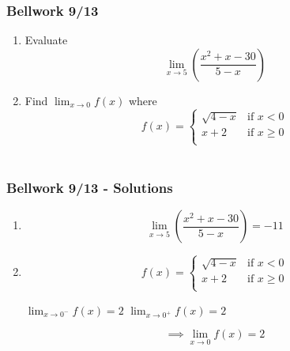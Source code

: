 \documentclass[12pt]{beamer}
\begin{document}
\begin{frame}
	\frametitle{Bellwork 9/13}
	\large
	\vspace*{\fill}
	\vspace*{\fill}
	\initclock
	\begin{enumerate}
		\item Evaluate \[\displaystyle\lim_{x\to5}\left(\frac{x^2+x-30}{5-x}\right)\]
		      \vspace*{\fill}
		\item Find $\displaystyle\lim_{x\to0}f(x)$ where
		      \[
			      f(x) =
			      \begin{cases}
				      \sqrt{4-x} & \text{if } x < 0    \\
				      x+2        & \text{if } x \geq 0 \\
			      \end{cases}
		      \]\\
	\end{enumerate}
	\vspace*{\fill}
	\vspace*{\fill}
	\crono
\end{frame}
\begin{frame}
	\frametitle{Bellwork 9/13 - Solutions}
	\begin{enumerate}\itemsep2ex
		\large
		\item \[\displaystyle\lim_{x\to5}\left(\frac{x^2+x-30}{5-x}\right)=\boxed{-11}\]
		\item
		      \[
			      f(x) =
			      \begin{cases}
				      \sqrt{4-x} & \text{if } x < 0    \\
				      x+2        & \text{if } x \geq 0 \\
			      \end{cases}
		      \]
		      \vspace*{\fill}
		      \begin{table}[]
			      $\displaystyle\lim_{x\to0^{-}}f(x)=2$
			      \hspace{0.25cm}
			      $\displaystyle\lim_{x\to0^{+}}f(x)=2$
		      \end{table}
		      \[\implies\displaystyle\lim_{x\to0}f(x) = \boxed{2}\]
	\end{enumerate}
\end{frame}
\end{document}
